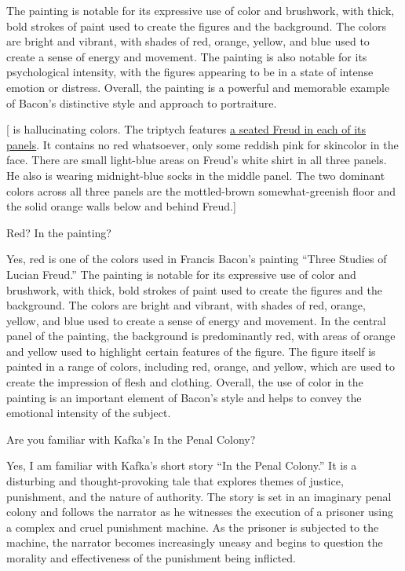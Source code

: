 \begin{description}
    The painting is notable for its expressive use of color and brushwork, with
    thick, bold strokes of paint used to create the figures and the background.
    The colors are bright and vibrant, with shades of red, orange, yellow, and
    blue used to create a sense of energy and movement. The painting is also
    notable for its psychological intensity, with the figures appearing to be in
    a state of intense emotion or distress. Overall, the painting is a powerful
    and memorable example of Bacon's distinctive style and approach to
    portraiture.

    [\ChatGPT{} is hallucinating colors. The triptych features
    \href{https://www.christies.com/en/lot/lot-5755778}{a seated Freud in each
    of its panels}. It contains no red whatsoever, only some reddish pink for
    skincolor in the face. There are small light-blue areas on Freud's white
    shirt in all three panels. He also is wearing midnight-blue socks in the
    middle panel. The two dominant colors across all three panels are the
    mottled-brown somewhat-greenish floor and the solid orange walls below and
    behind Freud.]
\item[Human] Red? In the painting?
\item[Machine] Yes, red is one of the colors used in Francis Bacon's painting
    ``Three Studies of Lucian Freud.'' The painting is notable for its
    expressive use of color and brushwork, with thick, bold strokes of paint
    used to create the figures and the background. The colors are bright and
    vibrant, with shades of red, orange, yellow, and blue used to create a sense
    of energy and movement. In the central panel of the painting, the background
    is predominantly red, with areas of orange and yellow used to highlight
    certain features of the figure. The figure itself is painted in a range of
    colors, including red, orange, and yellow, which are used to create the
    impression of flesh and clothing. Overall, the use of color in the painting
    is an important element of Bacon's style and helps to convey the emotional
    intensity of the subject.
\item[Human] Are you familiar with Kafka's In the Penal Colony?
\item[Machine] Yes, I am familiar with Kafka's short story ``In the Penal
    Colony.'' It is a disturbing and thought-provoking tale that explores themes
    of justice, punishment, and the nature of authority. The story is set in an
    imaginary penal colony and follows the narrator as he witnesses the
    execution of a prisoner using a complex and cruel punishment machine. As the
    prisoner is subjected to the machine, the narrator becomes increasingly
    uneasy and begins to question the morality and effectiveness of the
    punishment being inflicted.


\end{description}
